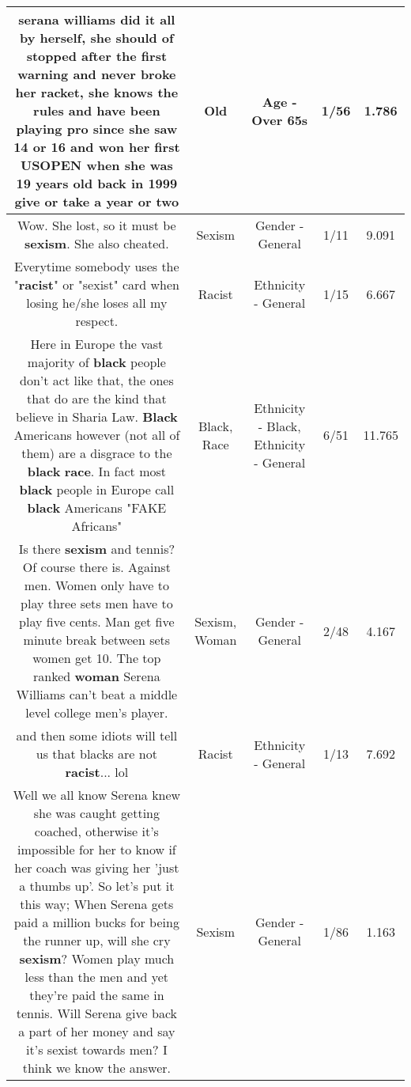 \documentclass[11pt]{article}
\newlength\mylength
\begin{document}
\begin{center}
\begin{longtable}{|C{.65\mylength}|C{.30\mylength}|C{.12\mylength}|C{.12\mylength}|C{.12\mylength}|}
  \small serana williams did it all by herself, she should of stopped after the first warning and never broke her racket, she knows the rules and have been playing pro since she saw 14 or 16 and won her first USOPEN when she was 19 years \textbf{old} back in 1999 give or take a year or two\normalsize   & Old & Age - Over 65s & 1/56 & 1.786 \\  \hline
  \small Wow. She lost, so it must be \textbf{sexism}. She also cheated.\normalsize   & Sexism & Gender - General & 1/11 & 9.091 \\  \hline
  \small Everytime somebody uses the "\textbf{racist}" or "sexist" card when losing he/she loses all my respect.\normalsize   & Racist & Ethnicity - General & 1/15 & 6.667 \\  \hline
  \small Here in Europe the vast majority of \textbf{black} people don't act like that, the ones that do are the kind that believe in Sharia Law. \textbf{Black} Americans however (not all of them) are a disgrace to the \textbf{black} \textbf{race}. In fact most \textbf{black} people in Europe call \textbf{black} Americans "FAKE Africans"\normalsize   & Black, Race & Ethnicity - Black, Ethnicity - General & 6/51 & 11.765 \\  \hline
  \small Is there \textbf{sexism} and tennis? Of course there is. Against men. Women only have to play three sets men have to play five cents. Man get five minute break between sets women get 10. The top ranked \textbf{woman} Serena Williams can't beat a middle level college men's player.\normalsize   & Sexism, Woman & Gender - General & 2/48 & 4.167 \\  \hline
  \small and then some idiots will tell us that blacks are not \textbf{racist}... lol\normalsize   & Racist & Ethnicity - General & 1/13 & 7.692 \\  \hline
  \small Well we all know Serena knew she was caught getting coached, otherwise it's impossible for her to know if her coach was giving her 'just a thumbs up'. So let's put it this way; When Serena gets paid a million bucks for being the runner up, will she cry \textbf{sexism}? Women play much less than the men and yet they're paid the same in tennis. Will Serena give back a part of her money and say it's sexist towards men? I think we know the answer.\normalsize   & Sexism & Gender - General & 1/86 & 1.163 \\  \hline

\end{longtable}
\end{center}
\end{document}

